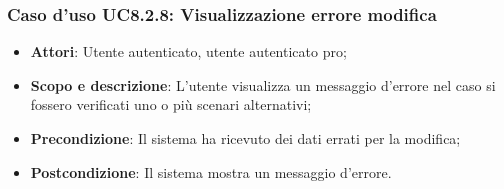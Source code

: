 	\subsubsection{Caso d'uso UC8.2.8: Visualizzazione errore modifica}
	\begin{itemize}
		\item
			\textbf{Attori}: Utente autenticato, utente autenticato pro;
		\item
			\textbf{Scopo e descrizione}: L'utente visualizza un messaggio d'errore nel caso si fossero verificati uno o più scenari alternativi;
		\item		
			\textbf{Precondizione}: Il sistema ha ricevuto dei dati errati per la modifica;
		\item
			\textbf{Postcondizione}: Il sistema mostra un messaggio d'errore.
	\end{itemize}	
	













